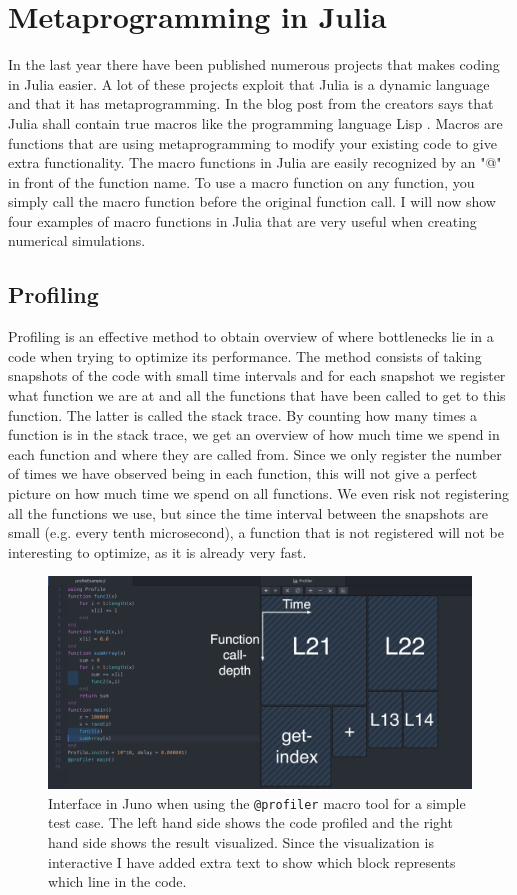 \section{Metaprogramming in Julia}
\label{sec:Metaprogramming}
In the last year there have been published numerous projects that makes coding in Julia easier. A lot of these projects exploit that Julia is a dynamic language and that it has metaprogramming. In the blog post from \cite{juliaBlogRelease2012} the creators says that Julia shall contain true macros like the programming language Lisp \emph{\citep{Lisp}}. Macros are functions that are using metaprogramming to modify your existing code to give extra functionality. The macro functions in Julia are easily recognized by an "@" in front of the function name. To use a macro function on any function, you simply call the macro function before the original function call. I will now show four examples of macro functions in Julia that are very useful when creating numerical simulations.
\subsection{Profiling}
\label{sec:profiling}
Profiling is an effective method to obtain overview of where bottlenecks lie in a code when trying to optimize its performance. The method consists of taking snapshots of the code with small time intervals and for each snapshot we register what function we are at and all the functions that have been called to get to this function. The latter is called the stack trace. By counting how many times a function is in the stack trace, we get an overview of how much time we spend in each function and where they are called from. Since we only register the number of times we have observed being in each function, this will not give a perfect picture on how much time we spend on all functions. We even risk not registering all the functions we use, but since the time interval between the snapshots are small (e.g. every tenth microsecond), a function that is not registered will not be interesting to optimize, as it is already very fast. 
\begin{figure}[htb]
    \centering
    \includegraphics[width = \textwidth]{figures/profiling_screenshot.png}
    \caption{Interface in Juno when using the \texttt{@profiler} macro tool for a simple test case. The left hand side shows the code profiled and the right hand side shows the result visualized. Since the visualization is interactive I have added extra text to show which block represents which line in the code.}
    \label{fig:profilingExample}
\end{figure}

